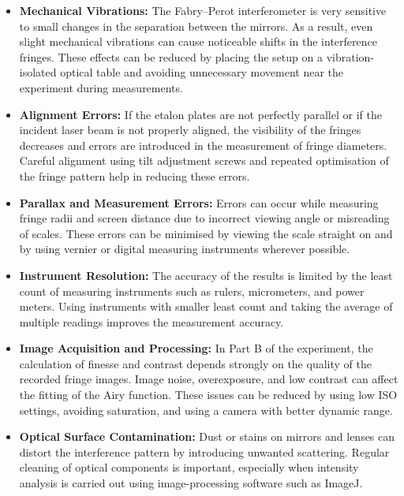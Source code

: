 \begin{itemize}
    \item \textbf{Mechanical Vibrations:}  
    The Fabry--Perot interferometer is very sensitive to small changes in the separation between the mirrors. As a result, even slight mechanical vibrations can cause noticeable shifts in the interference fringes. These effects can be reduced by placing the setup on a vibration-isolated optical table and avoiding unnecessary movement near the experiment during measurements.

    \item \textbf{Alignment Errors:}  
    If the etalon plates are not perfectly parallel or if the incident laser beam is not properly aligned, the visibility of the fringes decreases and errors are introduced in the measurement of fringe diameters. Careful alignment using tilt adjustment screws and repeated optimisation of the fringe pattern help in reducing these errors.

    \item \textbf{Parallax and Measurement Errors:}  
    Errors can occur while measuring fringe radii and screen distance due to incorrect viewing angle or misreading of scales. These errors can be minimised by viewing the scale straight on and by using vernier or digital measuring instruments wherever possible.

    \item \textbf{Instrument Resolution:}  
    The accuracy of the results is limited by the least count of measuring instruments such as rulers, micrometers, and power meters. Using instruments with smaller least count and taking the average of multiple readings improves the measurement accuracy.

    \item \textbf{Image Acquisition and Processing:}  
    In Part B of the experiment, the calculation of finesse and contrast depends strongly on the quality of the recorded fringe images. Image noise, overexposure, and low contrast can affect the fitting of the Airy function. These issues can be reduced by using low ISO settings, avoiding saturation, and using a camera with better dynamic range.

    \item \textbf{Optical Surface Contamination:}  
    Dust or stains on mirrors and lenses can distort the interference pattern by introducing unwanted scattering. Regular cleaning of optical components is important, especially when intensity analysis is carried out using image-processing software such as ImageJ.


\end{itemize}
